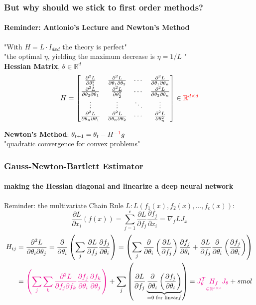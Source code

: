 \documentclass[
	11pt, %
	aspectratio=169, %
]{beamer}
\begin{document}
\begin{frame}
	\frametitle{But why should we stick to first order methods?}
	\framesubtitle{Reminder: Antionio's Lecture and Newton's Method}
		"With $H= L \cdot I_{dxd}$ the theory is perfect" \\
		"the optimal $\eta$, yielding the maximum decrease is $\eta = 1/L$ "\\
		\vspace{1em}
		\textbf{{Hessian Matrix}}, $\theta \in \mathbb{R}^d$
\[
H = \begin{bmatrix}
\frac{\partial^2 L}{\partial \theta_1^2} & \frac{\partial^2 L}{\partial \theta_1 \partial \theta_2} & \cdots & \frac{\partial^2 L}{\partial \theta_1 \partial \theta_n} \\
\frac{\partial^2 L}{\partial \theta_2 \partial \theta_1} & \frac{\partial^2 L}{\partial \theta_2^2} & \cdots & \frac{\partial^2 L}{\partial \theta_2 \partial \theta_n} \\
\vdots & \vdots & \ddots & \vdots \\
\frac{\partial^2 L}{\partial \theta_n \partial \theta_1} & \frac{\partial^2 L}{\partial \theta_n \partial \theta_2} & \cdots & \frac{\partial^2 L}{\partial \theta_n^2}
\end{bmatrix} \in \textcolor{red}{\mathbb{R}^{d\times d}}
\]

		\textbf{Newton's Method}: $\theta_{t+1} = \theta_t - H^{\textcolor{red}{-1}} g$\\
		"quadratic convergence for convex problems"

\end{frame}

\begin{frame}
	\frametitle{Gauss-Newton-Bartlett Estimator }
	\framesubtitle{making the Hessian diagonal and linearize a deep neural network}
	Reminder: the multivariate Chain Rule $L: L(f_1(x), f_2(x), \dots, f_c(x))$:\[
\frac{\partial L}{\partial x_i}(f(x)) = \sum_{j=1}^c \frac{\partial L}{\partial f_j} \frac{\partial f_j}{\partial x_i} = \nabla_f L  J_x
\]
				 \begin{align*}
					H_{ij} &= \frac{\partial^2 L}{\partial \theta_i \partial \theta_j} =\frac{\partial}{\partial \theta_i }\left( \sum_j \frac{\partial L}{\partial f_j} \frac{\partial f_j}{\partial \theta_i}  \right) 
				 =\left( \sum_j \frac{\partial}{\partial \theta_i } \left(\frac{\partial L}{\partial f_j}\right) \frac{\partial f_j}{\partial \theta_i} +    \frac{\partial L}{\partial f_j} \frac{\partial}{\partial \theta_i }\left( \frac{\partial f_j}{\partial \theta_i}\right) \right) \\
				 &=\textcolor{magenta}{\left( \sum_j \sum_k \frac{\partial^2 L }{\partial f_j \partial f_k }  \frac{\partial f_j}{\partial \theta_i} \frac{\partial f_k}{\partial \theta_j}\right)}+ \sum_j \left(  \frac{\partial L}{\partial f_j} \underbrace{\frac{\partial}{\partial \theta_i }\left( \frac{\partial f_j}{\partial \theta_i}\right)}_{=0 \text{ for linear}f} \right)  = \textcolor{magenta}{J_\theta^T \underset{\in \mathbb{R}^{c\times c}}{H_f} J_\theta} +  smol
				 \end{align*}
\end{frame}
 
\end{document}
